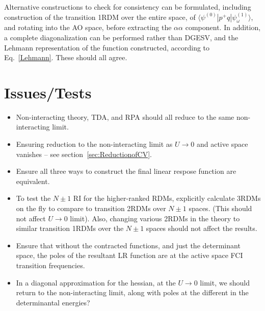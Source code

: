 \documentclass[a4paper,oneside,11pt]{article}
\numberwithin{equation}{section}
\begin{document}
Alternative constructions to check for consistency can be formulated, including construction of the transition 1RDM over the entire space, of 
$\langle \psi^{(0)} | p^{+} q | \psi^{(1)}_{\omega} \rangle$, and rotating into the AO space, before extracting the $\alpha \alpha$ component.
In addition, a complete diagonalization can be performed rather than DGESV, and the Lehmann representation of the function constructed, according to Eq.~\ref{Lehmann}. These should all agree.

\section{Issues/Tests}

\begin{itemize}
\item Non-interacting theory, TDA, and RPA should all reduce to the same non-interacting limit.
\item Ensuring reduction to the non-interacting limit as $U \rightarrow 0$ and active space vanishes -- see section~\ref{sec:ReductionofCV}. 
\item Ensure all three ways to construct the final linear respose function are equivalent.
\item To test the $N\pm1$ RI for the higher-ranked RDMs, explicitly calculate 3RDMs on the fly to compare to transition 2RDMs over $N\pm1$ spaces. 
(This should not affect $U\rightarrow0$ limit). Also, changing various 2RDMs in the theory
to similar transition 1RDMs over the $N\pm1$ spaces should not affect the results.
\item Ensure that without the contracted functions, and just the determinant space, the poles of the resultant LR function are at the active space FCI transition frequencies.
\item In a diagonal approximation for the hessian, at the $U\rightarrow 0$ limit, we should return to the non-interacting limit, along with poles at the different in the determinantal energies?
\end{itemize}
\end{document}
